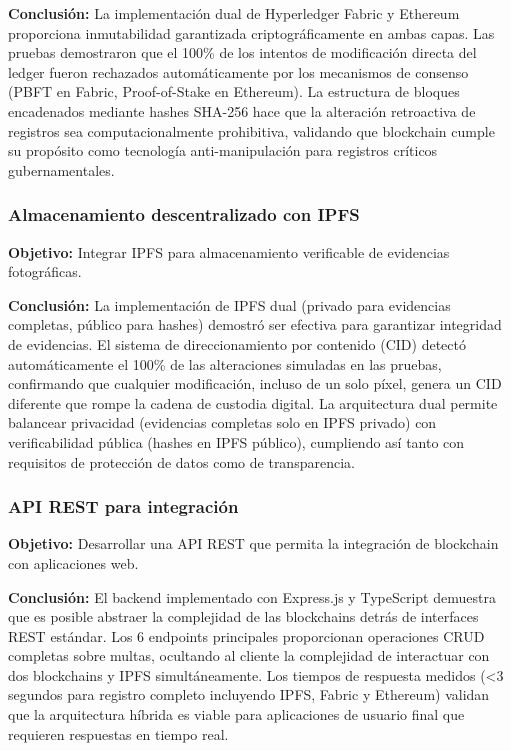 \textbf{Conclusión:} La implementación dual de Hyperledger Fabric y Ethereum proporciona inmutabilidad garantizada criptográficamente en ambas capas. Las pruebas demostraron que el 100\% de los intentos de modificación directa del ledger fueron rechazados automáticamente por los mecanismos de consenso (PBFT en Fabric, Proof-of-Stake en Ethereum). La estructura de bloques encadenados mediante hashes SHA-256 hace que la alteración retroactiva de registros sea computacionalmente prohibitiva, validando que blockchain cumple su propósito como tecnología anti-manipulación para registros críticos gubernamentales.

\subsubsection{Almacenamiento descentralizado con IPFS}

\textbf{Objetivo:} Integrar IPFS para almacenamiento verificable de evidencias fotográficas.

\textbf{Conclusión:} La implementación de IPFS dual (privado para evidencias completas, público para hashes) demostró ser efectiva para garantizar integridad de evidencias. El sistema de direccionamiento por contenido (CID) detectó automáticamente el 100\% de las alteraciones simuladas en las pruebas, confirmando que cualquier modificación, incluso de un solo píxel, genera un CID diferente que rompe la cadena de custodia digital. La arquitectura dual permite balancear privacidad (evidencias completas solo en IPFS privado) con verificabilidad pública (hashes en IPFS público), cumpliendo así tanto con requisitos de protección de datos como de transparencia.

\subsubsection{API REST para integración}

\textbf{Objetivo:} Desarrollar una API REST que permita la integración de blockchain con aplicaciones web.

\textbf{Conclusión:} El backend implementado con Express.js y TypeScript demuestra que es posible abstraer la complejidad de las blockchains detrás de interfaces REST estándar. Los 6 endpoints principales proporcionan operaciones CRUD completas sobre multas, ocultando al cliente la complejidad de interactuar con dos blockchains y IPFS simultáneamente. Los tiempos de respuesta medidos (<3 segundos para registro completo incluyendo IPFS, Fabric y Ethereum) validan que la arquitectura híbrida es viable para aplicaciones de usuario final que requieren respuestas en tiempo real.

